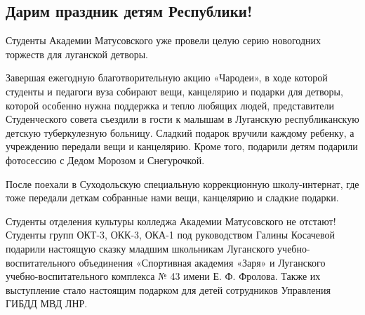  
 
 
 
 
\subsection{Дарим праздник детям Республики!}
\label{sec:26_12_2021.stz.edu.lnr.lgaki.1.prazdnik_deti_respubliki}


Студенты Академии Матусовского уже провели целую серию новогодних торжеств для
луганской детворы.


Завершая ежегодную благотворительную акцию «Чародеи», в ходе которой студенты и
педагоги вуза собирают вещи, канцелярию и подарки для детворы, которой особенно
нужна поддержка и тепло любящих людей, представители Студенческого совета
съездили в гости к малышам в Луганскую республиканскую детскую туберкулезную
больницу. Сладкий подарок вручили каждому ребенку, а учреждению передали вещи и
канцелярию. Кроме того, подарили детям подарили фотосессию с Дедом Морозом и
Снегурочкой.


После поехали в Суходольскую специальную коррекционную школу-интернат, где тоже
передали деткам собранные нами вещи, канцелярию и сладкие подарки.


Студенты отделения культуры колледжа Академии Матусовского не отстают! Студенты
групп ОКТ-3, ОКК-3, ОКА-1 под руководством Галины Косачевой подарили настоящую
сказку младшим школьникам Луганского учебно-воспитательного объединения
«Спортивная академия «Заря» и Луганского учебно-воспитательного комплекса № 43
имени Е. Ф. Фролова. Также их выступление стало настоящим подарком для детей
сотрудников Управления ГИБДД МВД ЛНР.


